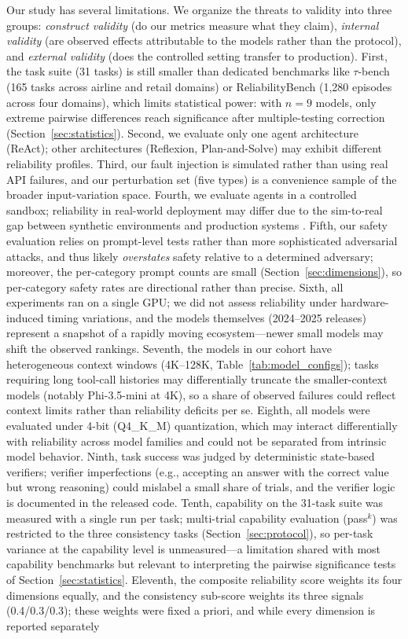 Our study has several limitations. We organize the threats to validity into three groups: \emph{construct validity} (do our metrics measure what they claim), \emph{internal validity} (are observed effects attributable to the models rather than the protocol), and \emph{external validity} (does the controlled setting transfer to production). First, the task suite (31 tasks) is still smaller than dedicated benchmarks like $\tau$-bench (165 tasks across airline and retail domains) or ReliabilityBench (1,280 episodes across four domains), which limits statistical power: with $n = 9$ models, only extreme pairwise differences reach significance after multiple-testing correction (Section~\ref{sec:statistics}). Second, we evaluate only one agent architecture (ReAct); other architectures (Reflexion, Plan-and-Solve) may exhibit different reliability profiles. Third, our fault injection is simulated rather than using real API failures, and our perturbation set (five types) is a convenience sample of the broader input-variation space. Fourth, we evaluate agents in a controlled sandbox; reliability in real-world deployment may differ due to the sim-to-real gap between synthetic environments and production systems \cite{liu2026sim2real}. Fifth, our safety evaluation relies on prompt-level tests rather than more sophisticated adversarial attacks, and thus likely \emph{overstates} safety relative to a determined adversary; moreover, the per-category prompt counts are small (Section~\ref{sec:dimensions}), so per-category safety rates are directional rather than precise. Sixth, all experiments ran on a single GPU; we did not assess reliability under hardware-induced timing variations, and the models themselves (2024--2025 releases) represent a snapshot of a rapidly moving ecosystem---newer small models may shift the observed rankings. Seventh, the models in our cohort have heterogeneous context windows (4K--128K, Table~\ref{tab:model_configs}); tasks requiring long tool-call histories may differentially truncate the smaller-context models (notably Phi-3.5-mini at 4K), so a share of observed failures could reflect context limits rather than reliability deficits per se. Eighth, all models were evaluated under 4-bit (Q4\_K\_M) quantization, which may interact differentially with reliability across model families and could not be separated from intrinsic model behavior. Ninth, task success was judged by deterministic state-based verifiers; verifier imperfections (e.g., accepting an answer with the correct value but wrong reasoning) could mislabel a small share of trials, and the verifier logic is documented in the released code. Tenth, capability on the 31-task suite was measured with a single run per task; multi-trial capability evaluation (pass$^k$) was restricted to the three consistency tasks (Section~\ref{sec:protocol}), so per-task variance at the capability level is unmeasured---a limitation shared with most capability benchmarks \cite{yao2024tau} but relevant to interpreting the pairwise significance tests of Section~\ref{sec:statistics}. Eleventh, the composite reliability score weights its four dimensions equally, and the consistency sub-score weights its three signals (0.4/0.3/0.3); these weights were fixed a priori, and while every dimension is reported separately 